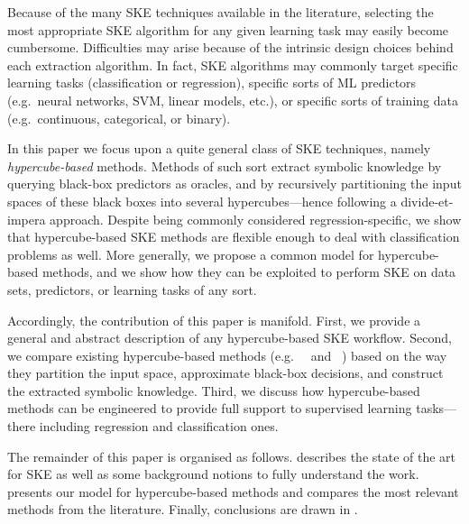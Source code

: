 \documentclass[
]{ceurart}
\begin{document}
Because of the many SKE techniques available in the literature, selecting the most appropriate SKE algorithm for any given learning task may easily become cumbersome.
%
Difficulties may arise because of the intrinsic design choices behind each extraction algorithm.
%
In fact, SKE algorithms may commonly target specific learning tasks (classification or regression), specific sorts of ML predictors (e.g.\ neural networks, SVM, linear models, etc.), or specific sorts of training data (e.g.\ continuous, categorical, or binary).

In this paper we focus upon a quite general class of SKE techniques, namely \emph{hypercube-based} methods.
%
Methods of such sort extract symbolic knowledge by querying black-box predictors as oracles, and by recursively partitioning the input spaces of these black boxes into several hypercubes---hence following a divide-et-impera approach.
%
Despite being commonly considered regression-specific, we show that hypercube-based SKE methods are flexible enough to deal with classification problems as well.
%
More generally, we propose a common model for hypercube-based methods, and we show how they can be exploited to perform SKE on data sets, predictors, or learning tasks of any sort.

Accordingly, the contribution of this paper is manifold.
%
First, we provide a general and abstract description of any hypercube-based SKE workflow.
%
Second, we compare existing hypercube-based methods (e.g.\ \iter{}~\cite{huysmans2006iter} and \gridex{}~\cite{gridex-extraamas2021}) based on the way they partition the input space, approximate black-box decisions, and construct the extracted symbolic knowledge.
%
Third, we discuss how hypercube-based methods can be engineered to provide full support to supervised learning tasks---there including regression and classification ones.
%

The remainder of this paper is organised as follows.
%
 describes the state of the art for SKE as well as some background notions to fully understand the work.
%
 presents our model for hypercube-based methods and compares the most relevant methods from the literature. %
%
Finally, conclusions are drawn in .
\end{document}
